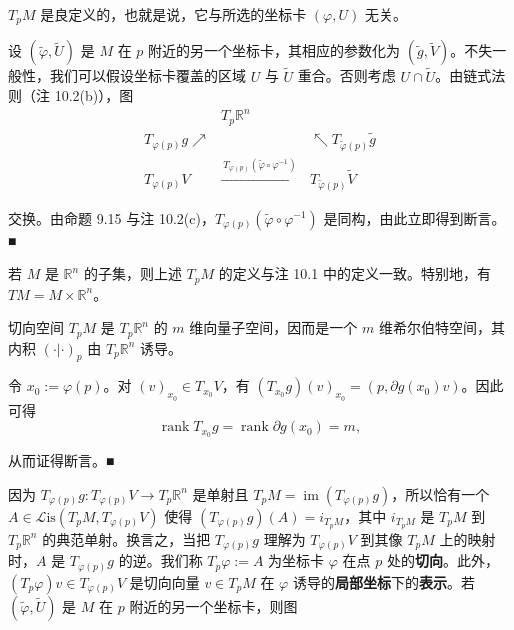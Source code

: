 \begin{remark}

\begin{items}
\item

$ T_{p}M $ 是良定义的，也就是说，它与所选的坐标卡 $ (\varphi,U) $ 无关。

\proofhead
设 $ (\tilde{\varphi},\tilde{U}) $ 是 $ M $ 在 $ p $ 附近的另一个坐标卡，其相应的参数化为 $ (\tilde{g},\tilde{V}) $。不失一般性，我们可以假设坐标卡覆盖的区域 $ U $ 与 $ \tilde{U} $ 重合。否则考虑 $ U\cap\tilde{U} $。由链式法则（注 10.2(b)），图
\begin{equation*}
\begin{array}{ccc} & T_{p}\mathbb{R}^{n} & \\ T_{\varphi(p)}g \nearrow & & \nwarrow T_{\tilde{\varphi}(p)}\tilde{g} \\ T_{\varphi(p)}V & \xrightarrow{\ T_{\varphi(p)}(\tilde{\varphi}\circ\varphi^{-1})\ } & T_{\tilde{\varphi}(p)}\tilde{V} \end{array}
\end{equation*}

交换。由命题 9.15 与注 10.2(c)，$ T_{\varphi(p)}(\tilde{\varphi}\circ\varphi^{-1}) $ 是同构，由此立即得到断言。\nobreak\hspace{0.35em}■

\item

若 $ M $ 是 $ \mathbb{R}^{n} $ 的子集，则上述 $ T_{p}M $ 的定义与注 10.1 中的定义一致。特别地，有 $ TM = M\times\mathbb{R}^{n} $。

\item

切向空间 $ T_{p}M $ 是 $ T_{p}\mathbb{R}^{n} $ 的 $ m $ 维向量子空间，因而是一个 $ m $ 维希尔伯特空间，其内积 $ (\cdot|\cdot)_{p} $ 由 $ T_{p}\mathbb{R}^{n} $ 诱导。

\proofhead
令 $ x_{0} := \varphi(p) $。对 $ (v)_{x_{0}} \in T_{x_{0}}V $，有 $ (T_{x_{0}}g)(v)_{x_{0}} = (p, \partial g(x_{0})v) $。因此可得
\[
\operatorname{rank}T_{x_{0}}g = \operatorname{rank}\partial g(x_{0}) = m ,
\]

从而证得断言。\nobreak\hspace{0.35em}■

\item

因为 $ T_{\varphi(p)}g : T_{\varphi(p)}V \to T_{p}\mathbb{R}^{n} $ 是单射且 $ T_{p}M = \operatorname{im}(T_{\varphi(p)}g) $，所以恰有一个 $ A \in \mathcal{L}\mathrm{is}(T_{p}M, T_{\varphi(p)}V) $ 使得 $ (T_{\varphi(p)}g)(A) = i_{T_{p}M} $，其中 $ i_{T_{p}M} $ 是 $ T_{p}M $ 到 $ T_{p}\mathbb{R}^{n} $ 的典范单射。换言之，当把 $ T_{\varphi(p)}g $ 理解为 $ T_{\varphi(p)}V $ 到其像 $ T_{p}M $ 上的映射时，$ A $ 是 $ T_{\varphi(p)}g $ 的逆。我们称 $ T_{p}\varphi := A $ 为坐标卡 $ \varphi $ 在点 $ p $ 处的\textbf{切向}。此外，$ (T_{p}\varphi)v \in T_{\varphi(p)}V $ 是切向向量 $ v \in T_{p}M $ 在 $ \varphi $ 诱导的\textbf{局部坐标}下的\textbf{表示}。若 $ (\tilde{\varphi},\tilde{U}) $ 是 $ M $ 在 $ p $ 附近的另一个坐标卡，则图


\end{items}
\end{remark}
